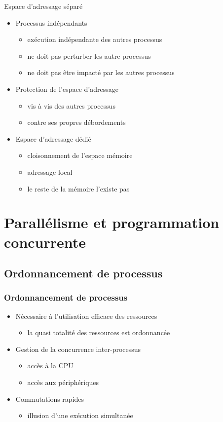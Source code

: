 \begin{frame}{Espace d’adressage séparé}
\begin{itemize}
\item Processus indépendants
\begin{itemize}
\item exécution indépendante des autres processus
\item ne doit pas perturber les autre processus
\item ne doit pas être impacté par les autres processus
\end{itemize}
\item Protection de l'espace d'adressage
\begin{itemize}
\item vis à vis des autres processus
\item contre ses propres débordements
\end{itemize}

\item Espace d'adressage dédié
\begin{itemize}
\item cloisonnement de l'espace mémoire
\item adressage local
\item le reste de la mémoire l'existe pas
\end{itemize}
\end{itemize}
\end{frame}


\section{Parallélisme et programmation concurrente}

\subsection{Ordonnancement de processus}

\begin{frame}
\frametitle{Ordonnancement de processus}
\begin{itemize}
\item Nécessaire à l’utilisation efficace des ressources
\begin{itemize}
\item la quasi totalité des ressources est ordonnancée
\end{itemize}
\item Gestion de la concurrence inter-processus
\begin{itemize}
\item accès à la CPU
\item accès aux périphériques
\end{itemize}
\item Commutations rapides
\begin{itemize}
\item illusion d’une exécution simultanée
\end{itemize}
\end{itemize}
\end{frame}


